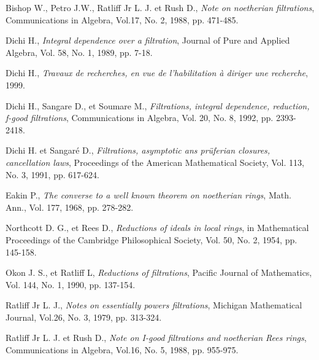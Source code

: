 \begin{thebibliography}{99}
	
	
	 Bishop W., Petro J.W., Ratliff Jr L. J. et Rush D.,\textit{ Note on noetherian filtrations}, Communications in Algebra, Vol.17, No. 2, 1988, pp. 471-485.
	
	 Dichi H.,\textit{ Integral dependence over a filtration}, Journal of Pure and Applied Algebra, Vol. 58, No. 1, 1989, pp. 7-18. 
	
	 Dichi H., \textit{Travaux de recherches, en vue de l'habilitation à diriger une recherche}, 1999.
	
	 Dichi H., Sangare D., et Soumare M.,\textit{ Filtrations, integral dependence, reduction, f-good filtrations}, Communications in Algebra, Vol. 20, No. 8, 1992, pp. 2393-2418.
	
	 Dichi H. et Sangaré D.,\textit{ Filtrations, asymptotic ans prüferian closures, cancellation laws}, Proceedings of the American Mathematical Society, Vol. 113, No. 3, 1991, pp. 617-624. 
	
	 Eakin P., \textit{The converse to a well known theorem on noetherian rings}, Math. Ann., Vol. 177, 1968, pp. 278-282.
	
	 Northcott D. G., et Rees D.,\textit{ Reductions of ideals in local rings}, in Mathematical Proceedings of the Cambridge Philosophical Society, Vol. 50, No. 2, 1954, pp. 145-158.
	
	 Okon J. S., et Ratliff L,\textit{ Reductions of filtrations}, Pacific Journal of Mathematics, Vol. 144, No. 1, 1990, pp. 137-154.
	
	 Ratliff Jr L. J.,\textit{ Notes on essentially powers filtrations}, Michigan Mathematical Journal, Vol.26, No. 3, 1979, pp. 313-324.
	
	 Ratliff Jr L. J. et Rush D.,\textit{ Note on I-good filtrations and noetherian Rees rings}, Communications in Algebra, Vol.16, No. 5, 1988, pp. 955-975.

\end{thebibliography}
